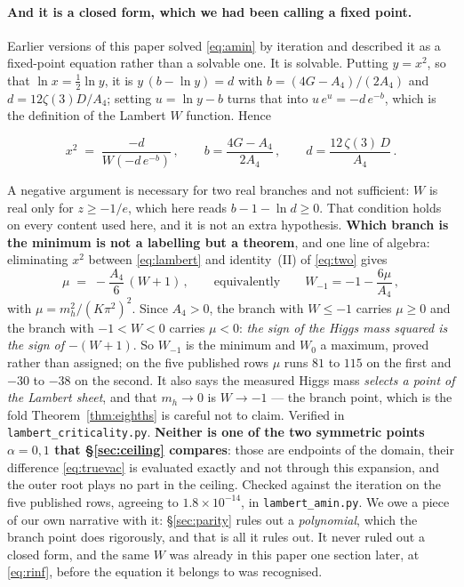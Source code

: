 \documentclass[11pt,a4paper]{article}
\newenvironment{keyeq}
  {\begin{center}\setlength{\fboxsep}{9pt}\setlength{\fboxrule}{0.8pt}%
   \begin{lrbox}{\keyeqbox}\begin{minipage}{0.88\textwidth}}
  {\end{minipage}\end{lrbox}%
   \fcolorbox{hdrblue!55}{hdrblue!6}{\usebox{\keyeqbox}}\end{center}}
\begin{document}
\paragraph{And it is a closed form, which we had been calling a fixed point.} Earlier versions of
this paper solved \eqref{eq:amin} by iteration and described it as a fixed-point equation rather
than a solvable one. It is solvable. Putting $y=x^2$, so that $\ln x=\tfrac12\ln y$, it is
$y\,(b-\ln y)=d$ with $b=(4G-A_4)/(2A_4)$ and $d=12\zeta(3)D/A_4$; setting $u=\ln y-b$ turns that
into $u\,e^{u}=-d\,e^{-b}$, which is the definition of the Lambert $W$ function. Hence
\begin{keyeq}
\begin{equation}\label{eq:lambert}
  x^{2}\;=\;\frac{-d}{W\!\left(-d\,e^{-b}\right)}\,,\qquad
  b=\frac{4G-A_4}{2A_4}\,,\qquad d=\frac{12\,\zeta(3)\,D}{A_4}\,.
\end{equation}
\end{keyeq}
A negative argument is necessary for two real branches and not sufficient: $W$ is real only for
$z\ge-1/e$, which here reads $b-1-\ln d\ge0$. That condition holds on every content used here,
and it is not an extra hypothesis. \textbf{Which branch is the minimum is not a labelling but a
theorem}, and one line of algebra: eliminating $x^2$ between \eqref{eq:lambert} and identity~(II)
of \eqref{eq:two} gives
\begin{equation}\label{eq:branchmu}
  \mu\;=\;-\frac{A_4}{6}\,(W+1)\,,\qquad\text{equivalently}\qquad W_{-1}=-1-\frac{6\mu}{A_4}\,,
\end{equation}
with $\mu=m_h^2/(K\pi^2)^2$. Since $A_4>0$, the branch with $W\le-1$ carries $\mu\ge0$ and the
branch with $-1<W<0$ carries $\mu<0$: \emph{the sign of the Higgs mass squared is the sign of
$-(W+1)$}. So $W_{-1}$ is the minimum and $W_{0}$ a maximum, proved rather than assigned; on the
five published rows $\mu$ runs $81$ to $115$ on the first and $-30$ to $-38$ on the second. It
also says the measured Higgs mass \emph{selects a point of the Lambert sheet}, and that $m_h\to0$
is $W\to-1$ --- the branch point, which is the fold Theorem~\ref{thm:eighths} is careful not to
claim. Verified in \texttt{lambert\_\allowbreak criticality.py}. \textbf{Neither is one of the two symmetric
points $\alpha=0,1$ that \S\ref{sec:ceiling} compares}: those are endpoints of the domain, their
difference \eqref{eq:truevac} is evaluated exactly and not through this expansion, and the outer
root plays no part in the ceiling. Checked against the iteration on the five
published rows, agreeing to $1.8\times10^{-14}$, in \texttt{lambert\_\allowbreak amin.py}. We owe
a piece of our own narrative with it: \S\ref{sec:parity} rules
out a \emph{polynomial}, which the branch point does rigorously, and that is all it rules out. It
never ruled out a closed form, and the same $W$ was already in this paper one section
later, at \eqref{eq:rinf}, before the equation it belongs to was recognised.
\end{document}
